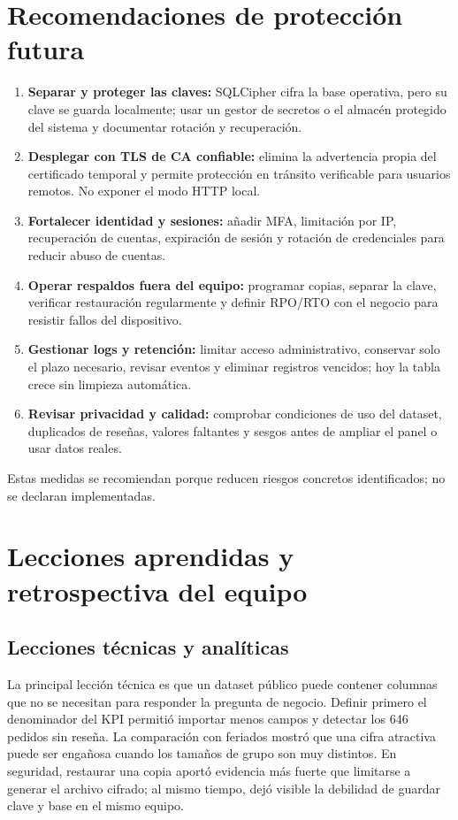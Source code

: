 \documentclass[12pt,a4paper]{article}
\begin{document}
\section{Recomendaciones de protección futura}
\begin{enumerate}
\item \textbf{Separar y proteger las claves:} SQLCipher cifra la base operativa, pero su clave se guarda localmente; usar un gestor de secretos o el almacén protegido del sistema y documentar rotación y recuperación.
\item \textbf{Desplegar con TLS de CA confiable:} elimina la advertencia propia del certificado temporal y permite protección en tránsito verificable para usuarios remotos. No exponer el modo HTTP local.
\item \textbf{Fortalecer identidad y sesiones:} añadir MFA, limitación por IP, recuperación de cuentas, expiración de sesión y rotación de credenciales para reducir abuso de cuentas.
\item \textbf{Operar respaldos fuera del equipo:} programar copias, separar la clave, verificar restauración regularmente y definir RPO/RTO con el negocio para resistir fallos del dispositivo.
\item \textbf{Gestionar logs y retención:} limitar acceso administrativo, conservar solo el plazo necesario, revisar eventos y eliminar registros vencidos; hoy la tabla crece sin limpieza automática.
\item \textbf{Revisar privacidad y calidad:} comprobar condiciones de uso del dataset, duplicados de reseñas, valores faltantes y sesgos antes de ampliar el panel o usar datos reales.
\end{enumerate}
Estas medidas se recomiendan porque reducen riesgos concretos identificados; no se declaran implementadas.

\section{Lecciones aprendidas y retrospectiva del equipo}
\subsection{Lecciones técnicas y analíticas}
La principal lección técnica es que un dataset público puede contener columnas que no se necesitan para responder la pregunta de negocio. Definir primero el denominador del KPI permitió importar menos campos y detectar los 646 pedidos sin reseña. La comparación con feriados mostró que una cifra atractiva puede ser engañosa cuando los tamaños de grupo son muy distintos. En seguridad, restaurar una copia aportó evidencia más fuerte que limitarse a generar el archivo cifrado; al mismo tiempo, dejó visible la debilidad de guardar clave y base en el mismo equipo.
\end{document}
